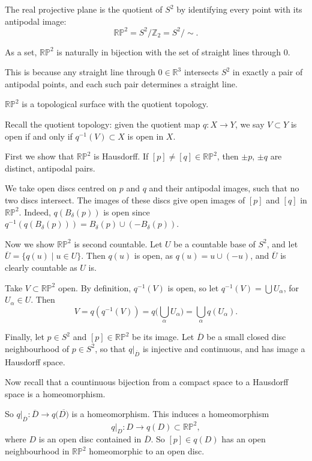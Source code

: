 \documentclass[12pt]{article}
\begin{document}
\begin{definition}
	The real projective plane is the quotient of $S^2$ by identifying every point with its antipodal image:
	\[
	\mathbb{RP}^2 = S^2/\mathbb{Z}_2 = S^2/\sim
	.\]
\end{definition}

\begin{lemma}
	As a set, $\mathbb{RP}^2$ is naturally in bijection with the set of straight lines through $0$.
\end{lemma}

This is because any straight line through $0 \in \mathbb{R}^3$ intersects $S^2$ in exactly a pair of antipodal points, and each such pair determines a straight line.

\begin{lemma}
	$\mathbb{RP}^2$ is a topological surface with the quotient topology.
\end{lemma}

Recall the quotient topology: given the quotient map $q : X \to Y$, we say $V \subset Y$ is open if and only if $q^{-1}(V) \subset X$ is open in $X$.

\begin{proofbox}
	First we show that $\mathbb{RP}^2$ is Hausdorff. If $[p] \neq [q] \in \mathbb{RP}^2$, then $\pm p$, $\pm q$ are distinct, antipodal pairs.

	We take open discs centred on $p$ and $q$ and their antipodal images, such that no two discs intersect. The images of these discs give open images of $[p]$ and $[q]$ in $\mathbb{RP}^2$. Indeed, $q(B_{\delta}(p))$ is open since $q^{-1}(q(B_{\delta}(p))) = B_{\delta}(p) \cup (-B_{\delta}(p))$.

	Now we show $\mathbb{RP}^2$ is second countable. Let $U$ be a countable base of $S^2$, and let $\overline{U} = \{q(u) \mid u \in U\}$. Then $q(u)$ is open, as $q(u) = u \cup (-u)$, and $\overline{U}$ is clearly countable as $U$ is.

	Take $V \subset \mathbb{RP}^2$ open. By definition, $q^{-1}(V)$ is open, so let $q^{-1}(V) = \bigcup U_{\alpha}$, for $U_{\alpha} \in U$. Then
	\[
	V = q(q^{-1}(V)) = q\biggl( \bigcup_{\alpha} U_{\alpha}\biggr) = \bigcup_{\alpha}q(U_{\alpha})
	.\]

	Finally, let $p \in S^2$ and $[p] \in \mathbb{RP}^2$ be its image. Let $\overline{D}$ be a small closed disc neighbourhood of $p \in S^2$, so that $q|_{\overline{D}}$ is injective and continuous, and has image a Hausdorff space.

	Now recall that a countinuous bijection from a compact space to a Hausdorff space is a homeomorphism.

	So $q|_{\overline{D}} : \overline{D} \to q(\overline{D)}$ is a homeomorphism. This induces a homeomorphism
	\[
	q|_D : D \to q(D) \subset \mathbb{RP}^2
	,\]
	where $D$ is an open disc contained in $\overline{D}$. So $[p] \in q(D)$ has an open neighbourhood in $\mathbb{RP}^2$ homeomorphic to an open disc.
\end{proofbox}
\end{document}
